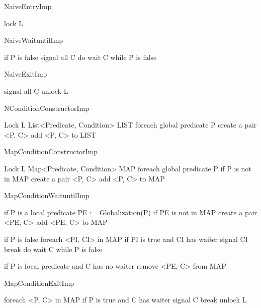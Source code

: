 \documentclass[preprint]{sigplanconf}
\begin{document}
\begin{SaveVerbatim}{NaiveEntryImp}

lock L 
\end{SaveVerbatim}

\begin{SaveVerbatim}{NaiveWaituntilImp}

if P is false
  signal all C
  do 
    wait C
  while P is false
\end{SaveVerbatim}

\begin{SaveVerbatim}{NaiveExitImp}

signal all C
unlock L
\end{SaveVerbatim}

\begin{SaveVerbatim}{NConditionConstructorImp}

Lock L
List<Predicate, Condition> LIST
foreach global predicate P
  create a pair <P, C>
  add <P, C> to LIST
\end{SaveVerbatim}


\begin{SaveVerbatim}{MapConditionConstructorImp}

Lock L
Map<Predicate, Condition> MAP
foreach global predicate P
  if P is not in MAP
    create a pair <P, C>
    add <P, C> to MAP 
\end{SaveVerbatim}

\begin{SaveVerbatim}{MapConditionWaituntilImp}

if P is a local predicate 
  PE := Globalization(P)
  if PE is not in MAP
    create a pair <PE, C>
    add <PE, C> to MAP
 
if P is false 
  foreach <PI, CI> in MAP
    if PI is true and CI has waiter
      signal CI
      break
  do 
    wait C
  while P is false

if P is local predicate 
    and C has no waiter
  remove <PE, C> from MAP
\end{SaveVerbatim}

\begin{SaveVerbatim}{MapConditionExitImp}

foreach <P, C> in MAP
  if P is true and C has waiter
    signal C
    break
unlock L
\end{SaveVerbatim}
\end{document}
